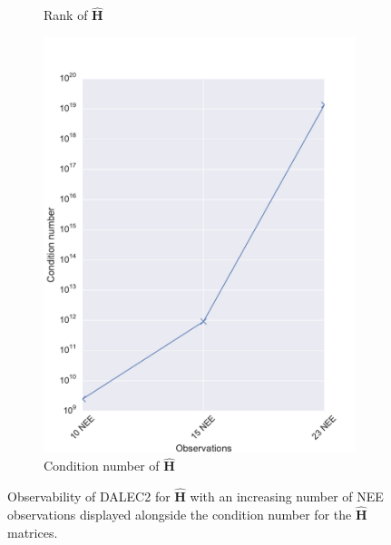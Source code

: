 \documentclass[11pt]{article}
\begin{document}
\begin{figure}[ht]
\begin{subfigure}[b]{0.49\textwidth}
        \caption{Rank of $\hat{\textbf{H}}$}
        \label{fig:D2_observabilityrank}
    \end{subfigure}
    \begin{subfigure}[b]{0.49\textwidth}
        \includegraphics[width=\textwidth]{dalec2_obsrankcond.pdf}
        \caption{Condition number of $\hat{\textbf{H}}$}
        \label{fig:D2_observabilitycond}
    \end{subfigure}
    \caption{Observability of DALEC2 for $\hat{\textbf{H}}$ with an increasing number of NEE observations displayed alongside the condition number for the $\hat{\textbf{H}}$ matrices.}
    \label{fig:D2_observability}
\end{figure}
\end{document}
